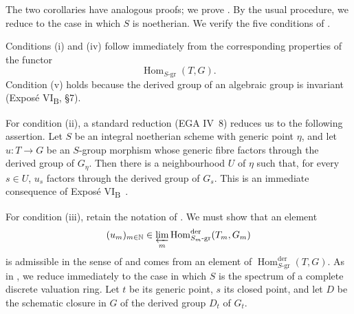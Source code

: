 

The two corollaries have analogous proofs; we prove
. By the usual procedure, we reduce to the case
in which \(S\) is noetherian. We verify the five conditions of
.

Conditions \textup{(i)} and \textup{(iv)} follow immediately from
the corresponding properties of the functor
\[
  \operatorname{Hom}_{S\text{-gr}}(T,G).
\]
Condition \textup{(v)} holds because the derived group of an
algebraic group is invariant (Exposé VI\textsubscript{B}, \S7).

For condition \textup{(ii)}, a standard reduction (EGA IV~8)
reduces us to the following assertion. Let \(S\) be an integral
noetherian scheme with generic point \(\eta\), and let
\(u:T\to G\) be an \(S\)-group morphism whose generic fibre factors
through the derived group of \(G_\eta\). Then there is a
neighbourhood \(U\) of \(\eta\) such that, for every \(s\in U\),
\(u_s\) factors through the derived group of \(G_s\). This is an
immediate consequence of Exposé VI\textsubscript{B}~.

For condition \textup{(iii)}, retain the notation of . We must show that an element
\[
  (u_m)_{m\in\mathbb N}\in
  \varprojlim_m
  \operatorname{Hom}^{\mathrm{der}}_{S_m\text{-gr}}(T_m,G_m)
\]
is admissible in the sense of  and comes from an
element of
\(\operatorname{Hom}^{\mathrm{der}}_{S\text{-gr}}(T,G)\).
As in , we reduce immediately to the case in which \(S\) is the
spectrum of a complete discrete valuation ring. Let \(t\) be its
generic point, \(s\) its closed point, and let \(D\) be the
schematic closure in \(G\) of the derived group \(D_t\) of \(G_t\).

